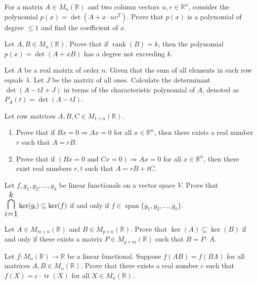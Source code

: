 \documentclass[12pt]{article}
\let\oldbigcap\bigcap
\renewcommand{\bigcap}{\mathlarger{\mathlarger{\oldbigcap}}}
\begin{document}
\begin{problem}
For a matrix $A\in M_n(\mathbb{R})$ and two column vectors $u,v\in\mathbb{R}^n$, consider the polynomial $p(x)=\det(A+x\cdot uv^T)$. Prove that $p(x)$ is a polynomial of degree $\le 1$ and find the coefficient of $x$.
\end{problem}

\begin{problem}
Let $A,B\in M_n(\mathbb{R})$. Prove that if $\operatorname{rank}(B)=k$, then the polynomial $p(x)=\det(A+xB)$ has a degree not exceeding $k$.
\end{problem}

\begin{problem}
Let $A$ be a real matrix of order $n$. Given that the sum of all elements in each row equals $\lambda$. Let $J$ be the matrix of all ones. Calculate the determinant $\det(A-tI+J)$ in terms of the characteristic polynomial of $A$, denoted as $P_A(t)=\det(A-tI)$.
\end{problem}

\begin{problem}
Let row matrices $A,B,C\in M_{1\times n}(\mathbb{R})$.
\begin{enumerate}[label=(\alph*)]
\item Prove that if $Bx=0\Rightarrow Ax=0$ for all $x\in\mathbb{R}^n$, then there exists a real number $r$ such that $A=rB$.
\item Prove that if $(Bx=0 \text{ and } Cx=0)\Rightarrow Ax=0$ for all $x\in\mathbb{R}^n$, then there exist real numbers $r,t$ such that $A=rB+tC$.
\end{enumerate}
\end{problem}

\begin{problem}
Let $f,g_1,g_2,\dots,g_k$ be linear functionals on a vector space $V$. Prove that $\displaystyle\bigcap_{i=1}^k \ker(g_i) \subseteq \ker(f)$ if and only if $f\in\operatorname{span}\{g_1,g_2,\dots,g_k\}$.
\end{problem}

\begin{problem}
Let $A\in M_{m\times n}(\mathbb{R})$ and $B\in M_{p\times n}(\mathbb{R})$. Prove that $\ker(A)\subseteq \ker(B)$ if and only if there exists a matrix $P\in M_{p\times m}(\mathbb{R})$ such that $B=P\cdot A$.
\end{problem}

\begin{problem}
Let $f:M_n(\mathbb{R})\to\mathbb{R}$ be a linear functional. Suppose $f(AB)=f(BA)$ for all matrices $A,B\in M_n(\mathbb{R})$. Prove that there exists a real number $c$ such that $f(X)=c\cdot\operatorname{tr}(X)$ for all $X\in M_n(\mathbb{R})$.
\end{problem}
\end{document}
